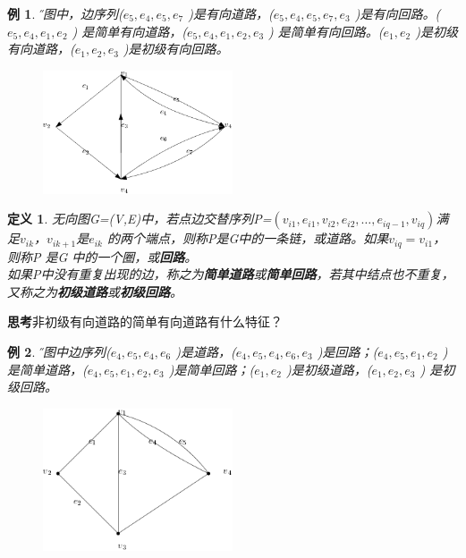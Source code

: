\documentclass[a4paper,11pt]{book}
\newtheorem{defination}{\textbf{定义}}[section]
\newtheorem{sample}{\textbf{例}}[section]
\begin{document}
\begin{sample}\H 下图中，边序列($e_5,e_4,e_5,e_7$ )是有向道路，($e_5,e_4,e_5,e_7,e_3$ )是有向回路。($e_5,e_4,e_1,e_2$ ) 是简单有向道路，($e_5,e_4,e_1,e_2,e_3$ ) 是简单有向回路。($e_1,e_2$ )是初级有向道路，($e_1,e_2,e_3$ )是初级有向回路。
\begin{figure}[H]
  \centering
  \includegraphics[width=0.5\textwidth]{2.1.png}\\
\caption{}\label{fig:2.1}
\end{figure}
\end{sample}
\begin{defination}\K
无向图G=(V,E)中，若点边交替序列P=$(v_{i1},e_{i1},v_{i2},e_{i2},\dots,e_{iq-1},v_{iq} )$满足$v_{ik}$，$v_{ik+1}$是$e_{ik}$ 的两个端点，则称P是G中的一条链，或道路。如果$v_{iq}=v_{i1}$，则称P 是G 中的一个圈，或\textbf{回路}。\\
如果P中没有重复出现的边，称之为\textbf{简单道路}或\textbf{简单回路}，若其中结点也不重复，又称之为\textbf{初级道路}或\textbf{初级回路}。
\end{defination}
\textbf{思考}非初级有向道路的简单有向道路有什么特征？
\begin{sample}\H
下图中边序列($e_4,e_5,e_4,e_6$ )是道路，($e_4,e_5,e_4,e_6,e_3$ )是回路；($e_4,e_5,e_1,e_2$ )是简单道路，($e_4,e_5,e_1,e_2,e_3$ )是简单回路；($e_1,e_2$ )是初级道路，($e_1,e_2,e_3$ ) 是初级回路。
\begin{figure}[H]
  \centering
  \includegraphics[width=0.5\textwidth]{2.2.png}\\
\caption{}\label{fig:2.2}
\end{figure}
\end{sample}
\end{document}
